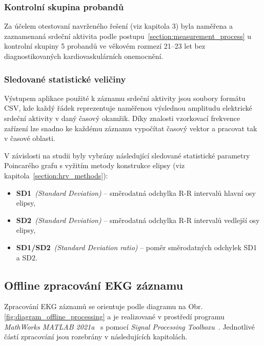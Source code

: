 \subsubsection{Kontrolní skupina probandů}
\label{section:probands}
Za účelem otestovaní navrženého řešení (viz kapitola 3) byla naměřena a
zaznamenaná srdeční aktivita podle postupu~\ref{section:measurement_process} u
kontrolní skupiny 5 probandů ve věkovém rozmezí 21--23 let bez diagnostikovaných
kardiovaskulárních onemocnění.

\subsubsection{Sledované statistické veličiny}
\label{section:selected_stats_vals}
Výstupem aplikace použité k záznamu srdeční aktivity jsou soubory formátu CSV,
kde každý řádek reprezentuje naměřenou výslednou amplitudu elektrické srdeční
aktivity v daný časový okamžik. Díky znalosti vzorkovací frekvence zařízení lze
snadno ke každému záznamu vypočítat časový vektor a pracovat tak v časové
oblasti.

V závislosti na studii byly vybrány následující sledované statistické parametry
Poincarého grafu s vyžitím metody konstrukce elipsy (viz
kapitola~\ref{section:hrv_methods}):
\begin{itemize}[noitemsep]
    \item \textbf{SD1}~\textit{(Standard Deviation)} -- směrodatná odchylka R-R
          intervalů hlavní osy elipsy,
    \item \textbf{SD2}~\textit{(Standard Deviation)} -- směrodatná odchylka R-R
          intervalů vedlejší osy elipsy,
    \item \textbf{SD1/SD2}~\textit{(Standard Deviation ratio)} -- poměr směrodatných odchylek SD1 a SD2.
\end{itemize}

\subsection{Offline zpracování EKG záznamu}
\label{section:offline_processing}
Zpracování EKG záznamů se orientuje podle diagramu na Obr.
\ref{fig:diagram_offline_processing} a je realizované v prostředí programu
\textit{MathWorks MATLAB 2021a}~\cite{MATLAB} s pomocí \textit{Signal Processing
Toolboxu}~\cite{matlabSPT}. Jednotlivé částí zpracování jsou rozebrány v
následujících kapitolách.

